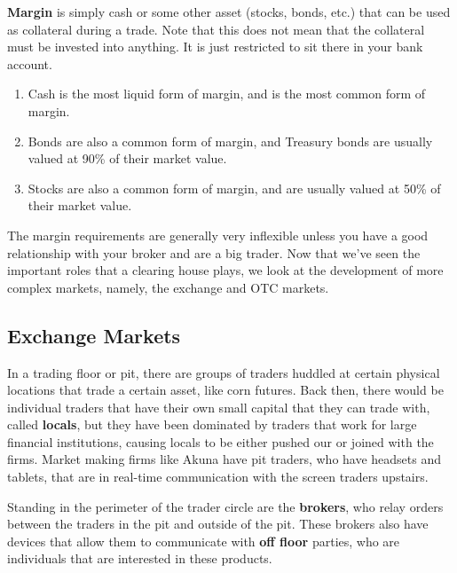 \documentclass{article}
\begin{document}
    \begin{definition}[Margin]
      \textbf{Margin} is simply cash or some other asset (stocks, bonds, etc.) that can be used as collateral during a trade. Note that this does not mean that the collateral must be invested into anything. It is just restricted to sit there in your bank account. 
      \begin{enumerate}
        \item Cash is the most liquid form of margin, and is the most common form of margin. 
        \item Bonds are also a common form of margin, and Treasury bonds are usually valued at 90\% of their market value.
        \item Stocks are also a common form of margin, and are usually valued at 50\% of their market value. 
      \end{enumerate}
    \end{definition}

    The margin requirements are generally very inflexible unless you have a good relationship with your broker and are a big trader. Now that we've seen the important roles that a clearing house plays, we look at the development of more complex markets, namely, the exchange and OTC markets. 

  \subsection{Exchange Markets}

    In a trading floor or pit, there are groups of traders huddled at certain physical locations that trade a certain asset, like corn futures. Back then, there would be individual traders that have their own small capital that they can trade with, called \textbf{locals}, but they have been dominated by traders that work for large financial institutions, causing locals to be either pushed our or joined with the firms. Market making firms like Akuna have pit traders, who have headsets and tablets, that are in real-time communication with the screen traders upstairs. 

    Standing in the perimeter of the trader circle are the \textbf{brokers}, who relay orders between the traders in the pit and outside of the pit. These brokers also have devices that allow them to communicate with \textbf{off floor} parties, who are individuals that are interested in these products. 
\end{document}
